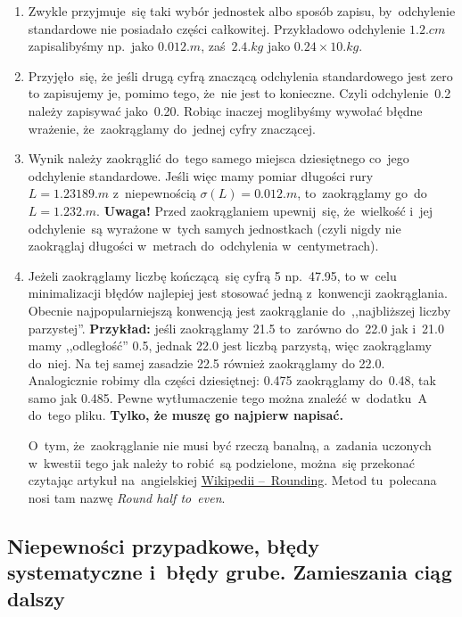 \documentclass[a4paper,11pt]{article}
\newcommand{\tb}{\textbf}
\begin{document}
\begin{enumerate}
\begin{figure}[h]
    \label{fig:odchylenie}
  \end{figure}
\item Zwykle przyjmuje~się taki wybór jednostek albo sposób zapisu,
  by~odchylenie standardowe nie posiadało części całkowitej.
  Przykładowo odchylenie $1.2 \si{.cm}$ zapisalibyśmy np.~jako
  $0.012 \si{.m}$, zaś~$2.4 \si{.kg}$ jako $0.24 \times 10 \si{.kg}$.
\item Przyjęło~się, że jeśli drugą cyfrą znaczącą odchylenia
  standardowego jest zero to zapisujemy je, pomimo tego, że~nie jest to konieczne. Czyli odchylenie~0.2 należy zapisywać jako~0.20.
  Robiąc inaczej moglibyśmy wywołać błędne wrażenie, że~zaokrąglamy do~jednej cyfry znaczącej.
\item Wynik należy zaokrąglić do~tego samego miejsca dziesiętnego
  co~jego odchylenie standardowe. Jeśli więc mamy pomiar długości rury
  $L = 1.23189 \si{.m}$ z~niepewnością $\sigma( L ) = 0.012 \si{.m}$,
  to~zaokrąglamy go~do~$L = 1.232 \si{.m}$. \tb{Uwaga!} Przed
  zaokrąglaniem upewnij~się, że~wielkość i~jej odchylenie~są wyrażone
  w~tych samych jednostkach (czyli nigdy nie zaokrąglaj długości
  w~metrach do~odchylenia w~centymetrach).
\item Jeżeli zaokrąglamy liczbę kończącą~się cyfrą 5 np.~47.95, to
  w~celu minimalizacji błędów najlepiej jest stosować jedną
  z~konwencji zaokrąglania. Obecnie najpopularniejszą konwencją jest
  zaokrąglanie do~,,najbliższej liczby parzystej''. \tb{Przykład:}
  jeśli zaokrąglamy 21.5 to~zarówno do~22.0 jak i~21.0 mamy
  ,,odległość'' 0.5, jednak 22.0 jest liczbą parzystą, więc
  zaokrąglamy do~niej. Na tej samej zasadzie 22.5 również zaokrąglamy
  do 22.0. Analogicznie robimy dla części dziesiętnej: 0.475
  zaokrąglamy do~0.48, tak samo jak 0.485. Pewne wytłumaczenie tego
  można znaleźć w~dodatku~A do~tego pliku. \tb{Tylko, że muszę go
    najpierw napisać.}

  O~tym, że~zaokrąglanie nie musi być rzeczą banalną, a~zadania
  uczonych w~kwestii tego jak należy to robić~są podzielone, można~się przekonać czytając
  artykuł na~angielskiej
  \href{https://en.wikipedia.org/wiki/Rounding}{Wikipedii
    --~Rounding}. Metod tu~polecana nosi tam nazwę \emph{Round half
    to~even}.
\end{enumerate}





\subsection{Niepewności przypadkowe, błędy systematyczne i~błędy
  grube. Zamieszania ciąg dalszy}
\label{sec:niepewnosci}
\end{document}
